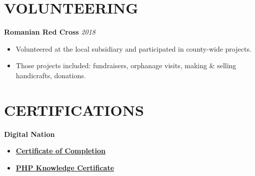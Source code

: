 \documentclass[margin]{res}
\begin{document}
\begin{resume}
  \section{VOLUNTEERING}
  \hspace{4mm}
  {\bf Romanian Red Cross} \hfill \textit{2018}
  \begin{itemize}
    \item Volunteered at the local subsidiary and participated in county-wide projects.
    \item Those projects included: fundraisers, orphanage visits, making \& selling handicrafts, donations.
  \end{itemize}

  \section{CERTIFICATIONS}
  \hspace{4mm}
  {\bf Digital Nation}
  \begin{itemize}
    \item \href{https://drive.google.com/file/d/15JN-Ko_CXP_WKGsrRxdQNzniaNkSrgTx/view}{\textbf{Certificate of Completion}}
    \item \href{https://drive.google.com/file/d/1Ahga9TNBsfRH_j3DBIsywD5D3XRbzElf/view}{\textbf{PHP Knowledge Certificate}}
  \end{itemize}
\end{resume}
\end{document}
